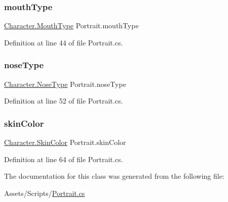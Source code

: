 \subsubsection{\texorpdfstring{mouthType}{mouthType}}
{\footnotesize\ttfamily \mbox{\hyperlink{class_character_aaefb65409260b3ad1511951aab1ddd6c}{Character.\+Mouth\+Type}} Portrait.\+mouth\+Type\hspace{0.3cm}{\ttfamily [get]}}



Definition at line 44 of file Portrait.\+cs.

\mbox{\label{class_portrait_a08a64694ad71d1f822acbf63845ae130}} 
\subsubsection{\texorpdfstring{noseType}{noseType}}
{\footnotesize\ttfamily \mbox{\hyperlink{class_character_a638a71f8525dc3a59596f7f4a7836036}{Character.\+Nose\+Type}} Portrait.\+nose\+Type\hspace{0.3cm}{\ttfamily [get]}}



Definition at line 52 of file Portrait.\+cs.

\mbox{\label{class_portrait_ac3ed63c9b306564506b4b96867990f84}} 
\subsubsection{\texorpdfstring{skinColor}{skinColor}}
{\footnotesize\ttfamily \mbox{\hyperlink{class_character_a726214a0fe480fffada7772697764824}{Character.\+Skin\+Color}} Portrait.\+skin\+Color\hspace{0.3cm}{\ttfamily [get]}}



Definition at line 64 of file Portrait.\+cs.



The documentation for this class was generated from the following file\+:\begin{DoxyCompactItemize}
\item 
Assets/\+Scripts/\mbox{\hyperlink{_portrait_8cs}{Portrait.\+cs}}\end{DoxyCompactItemize}
